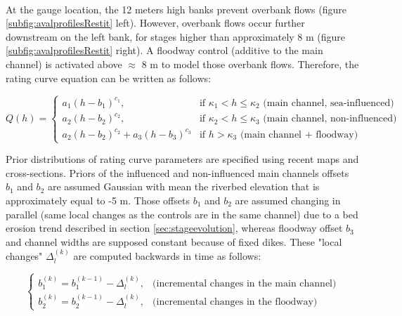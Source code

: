 \documentclass[11pt]{article}
\begin{document}
        \paragraph{}At the gauge location, the 12 meters high banks prevent overbank flows (figure \ref{subfig:avalprofilesRestit} left). However, overbank flows occur further downstream on the left bank, for stages higher than approximately 8 m (figure \ref{subfig:avalprofilesRestit} right). A floodway control (additive to the main channel) is activated above $\approx$ 8 m to model those overbank flows. Therefore, the rating curve equation can be written as follows: 
        
        \begin{equation}
        Q(h) =
          \begin{cases}
           a_1(h-b_1)^{c_1}, & \text{if $\kappa_1 < h \leq \kappa_2 $ (main channel, sea-influenced) }\\
           a_2(h-b_2)^{c_2}, & \text{if $\kappa_2 < h \leq \kappa_3 $ (main channel, non-influenced)}\\
           a_2(h-b_2)^{c_2}+ a_3(h-b_3)^{c_3} & \text{if $h > \kappa_3$ (main channel + floodway)}
          \end{cases}
          \label{eq:RcRes}
        \end{equation}

        Prior distributions of rating curve parameters are specified using recent maps and cross-sections. Priors of the influenced and non-influenced main channels offsets $b_1$ and $b_2$ are assumed Gaussian with mean the riverbed elevation that is approximately equal to -5 m. Those offsets $b_1$ and $b_2$ are assumed changing in parallel (same local changes as the controls are in the same channel) due to a bed erosion trend described in section \ref{sec:stageevolution}, whereas floodway offset $b_3$ and channel widths are supposed constant because of fixed dikes. These "local changes" $\Delta_l^{(k)}$ are computed backwards in time as follows: 

        \begin{equation}
          \begin{cases}
           b_1^{(k)} = b_1^{(k-1)}-\Delta_l^{(k)}, & \text{(incremental changes in the main channel)}\\
           b_2^{(k)} = b_2^{(k-1)}-\Delta_l^{(k)}, & \text{(incremental changes in the floodway)}
          \end{cases}
          \label{eq:SPD_Res}
        \end{equation}
        
\end{document}
